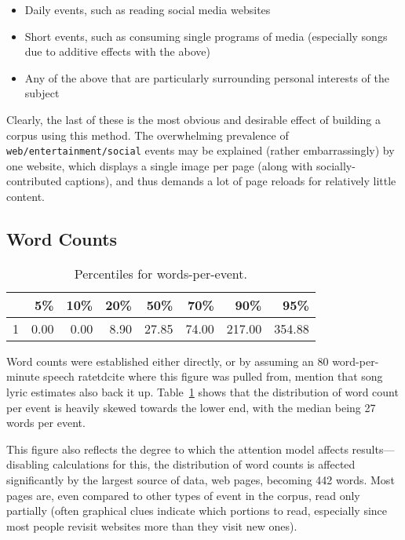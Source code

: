 \begin{itemize}
    \item Daily events, such as reading social media websites
    \item Short events, such as consuming single programs of media (especially songs due to additive effects with the above)
    \item Any of the above that are particularly surrounding personal interests of the subject
\end{itemize}

Clearly, the last of these is the most obvious and desirable effect of building a corpus using this method.  The overwhelming prevalence of \texttt{web/entertainment/social} events may be explained (rather embarrassingly) by one website, which displays a single image per page (along with socially-contributed captions), and thus demands a lot of page reloads for relatively little content.





\subsection{Word Counts}

\begin{table}[ht]
    \centering
    \begin{tabular}{rrrrrrrr}
        \hline
        & 5\% & 10\% & 20\% & 50\% & 70\% & 90\% & 95\% \\ 
        \hline
        1 & 0.00 & 0.00 & 8.90 & 27.85 & 74.00 & 217.00 & 354.88 \\ 
        \hline
    \end{tabular}
    \caption{Percentiles for words-per-event.}
    \label{table:personal:wordsperevent}
\end{table}

Word counts were established either directly, or by assuming an 80 word-per-minute speech ratetd{cite where this figure was pulled from, mention that song lyric estimates also back it up}.  Table~\ref{table:personal:wordsperevent} shows that the distribution of word count per event is heavily skewed towards the lower end, with the median being 27 words per event.

This figure also reflects the degree to which the attention model affects results---disabling calculations for this, the distribution of word counts is affected significantly by the largest source of data, web pages, becoming 442 words.  Most pages are, even compared to other types of event in the corpus, read only partially (often graphical clues indicate which portions to read, especially since most people revisit websites more than they visit new ones).









